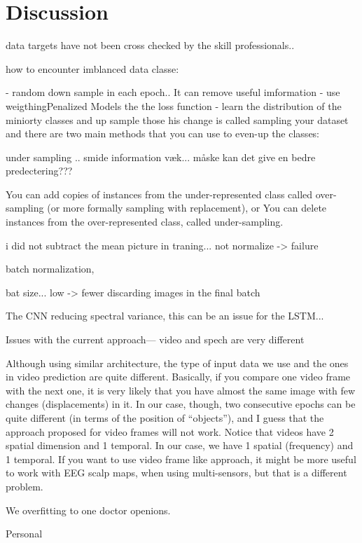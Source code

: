 \section{Discussion}
\label{sec:discussion}



data targets have not been cross checked by the skill professionals..


how to encounter imblanced data classe:

-  random down sample in each epoch.. It can remove useful imformation
- use weigthingPenalized Models the the loss function
- learn the distribution of the miniorty classes and up sample those
his change is called sampling your dataset and there are two main methods that you can use to even-up the classes:



under sampling .. smide information væk... måske kan det give en bedre predectering???




You can add copies of instances from the under-represented class called over-sampling (or more formally sampling with replacement), or
You can delete instances from the over-represented class, called under-sampling.



i did not subtract the mean picture in traning... not normalize -> failure


batch normalization,


bat size... low -> fewer discarding images in the final batch



The CNN reducing spectral variance, this can be an issue for the LSTM...


Issues with the current approach--- video and spech are very different

Although using similar architecture, the type of input data we use and the ones in video prediction are quite different. Basically, if you compare one video frame with the next one, it is very likely that you have almost the same image with few changes (displacements) in it. In our case, though, two consecutive epochs can be quite different (in terms of the position of “objects”), and I guess that the approach proposed for video frames will not work. Notice that videos have 2 spatial dimension and 1 temporal. In our case, we have 1 spatial (frequency) and 1 temporal. If you want to use video frame like approach, it might be more useful to work with EEG scalp maps, when using multi-sensors, but that is a different problem.



We overfitting to one doctor openions.

Personal 
